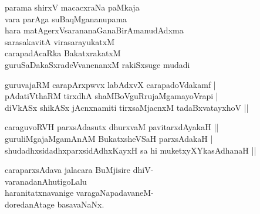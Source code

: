\begin{entry}
\gl{}
\begin{shl}
parama shirxV macacxraNa paMkaja\\
vara parAga suBaqMgananupama\\
hara matAgerxVsarananaGanaBirAmanudAdxma\\
sarasakavitA virasarayukatxM\\
carapadAcaRka BakatxrakatxM\\
guruSaDakaSxradeVvanenanxM rakiSxsuge mudadi
\end{shl}
\end{entry}

\begin{entry}
\begin{shl}
guruvajaRM carapArxpwvx labAdxvX carapadoVdakamf |\\
pAdatiVthaRM tirxdhA shaMBoVguRrujaMgamayoVrapi |\\
diVkASx shikASx jAcnxnamiti tirxsaMjacnxM tadaBxvatayxhoV ||
\end{shl}
\end{entry}

\begin{entry}
\begin{shl}
caraguvoRVH parxsAdasutx dhurxvaM pavitarxdAyakaH ||\\
guruliMgajaMgamAnAM BukatxsheVSaH parxsAdakaH |\\
shudadhxsidadhxparxsidAdhxKayxH sa hi muketxyXYkasAdhanaH ||
\end{shl}

\gl{}
\begin{shl}
caraparxsAdava jalacara BuMjisire dhiV-\\
varanadanAhutigoLalu\\
haranitatxnavanige varagaNapadavaneM-\\
doredanAtage basavaNaNx.
\end{shl}
\end{entry}

